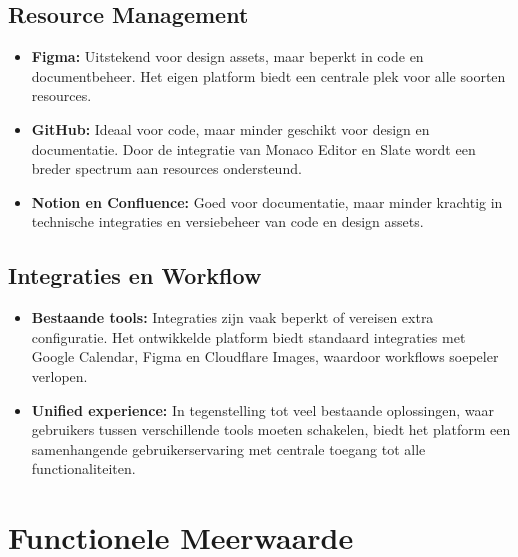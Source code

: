 \subsection{Resource Management}
\begin{itemize}
    \item \textbf{Figma:} Uitstekend voor design assets, maar beperkt in code en documentbeheer. Het eigen platform biedt een centrale plek voor alle soorten resources.
    \item \textbf{GitHub:} Ideaal voor code, maar minder geschikt voor design en documentatie. Door de integratie van Monaco Editor en Slate wordt een breder spectrum aan resources ondersteund.
    \item \textbf{Notion en Confluence:} Goed voor documentatie, maar minder krachtig in technische integraties en versiebeheer van code en design assets.
\end{itemize}

\subsection{Integraties en Workflow}
\begin{itemize}
    \item \textbf{Bestaande tools:} Integraties zijn vaak beperkt of vereisen extra configuratie. Het ontwikkelde platform biedt standaard integraties met Google Calendar, Figma en Cloudflare Images, waardoor workflows soepeler verlopen.
    \item \textbf{Unified experience:} In tegenstelling tot veel bestaande oplossingen, waar gebruikers tussen verschillende tools moeten schakelen, biedt het platform een samenhangende gebruikerservaring met centrale toegang tot alle functionaliteiten.
\end{itemize}

\section{Functionele Meerwaarde}
\label{sec:meerwaarde}

